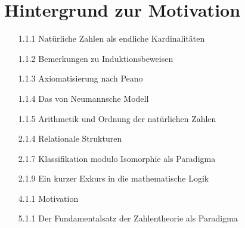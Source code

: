 \section{Hintergrund zur Motivation}

\begin{itemize}

  \item
  [1.1.1]
  Natürliche Zahlen als endliche Kardinalitäten

  \item
  [1.1.2]
  Bemerkungen zu Induktionsbeweisen

  \item
  [1.1.3]
  Axiomatisierung nach Peano

  \item
  [1.1.4]
  Das von Neumannsche Modell

  \item
  [1.1.5]
  Arithmetik und Ordnung der natürlichen Zahlen

  \item
  [2.1.4]
  Relationale Strukturen

  \item
  [2.1.7]
  Klassifikation modulo Isomorphie als Paradigma

  \item
  [2.1.9]
  Ein kurzer Exkurs in die mathematische Logik


  \item
  [4.1.1]
  Motivation

  \item
  [5.1.1]
  Der Fundamentalsatz der Zahlentheorie als Paradigma

\end{itemize}
